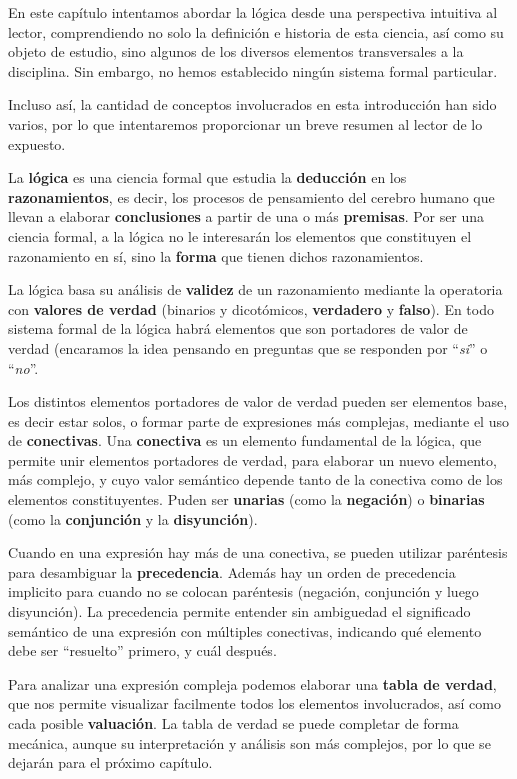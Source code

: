 En este capítulo intentamos abordar la lógica desde una perspectiva intuitiva al
lector, comprendiendo no solo la definición e historia de esta ciencia, así como
su objeto de estudio, sino algunos de los diversos elementos transversales a la
disciplina. Sin embargo, no hemos establecido ningún sistema formal particular.

Incluso así, la cantidad de conceptos involucrados en esta introducción han sido
varios, por lo que intentaremos proporcionar un breve resumen al lector de lo
expuesto.

La \textbf{lógica} es una ciencia formal que estudia la \textbf{deducción} en
los \textbf{razonamientos}, es decir, los procesos de pensamiento del cerebro
humano que llevan a elaborar \textbf{conclusiones} a partir de una o más
\textbf{premisas}. Por ser una ciencia formal, a la lógica no le interesarán los
elementos que constituyen el razonamiento en sí, sino la \textbf{forma} que
tienen dichos razonamientos.

La lógica basa su análisis de \textbf{validez} de un razonamiento mediante la
operatoria con \textbf{valores de verdad} (binarios y dicotómicos,
\textbf{verdadero} y \textbf{falso}). En todo sistema formal de la lógica habrá
elementos que son portadores de valor de verdad (encaramos la idea pensando en
preguntas que se responden por ``\textit{si}'' o ``\textit{no}''.

Los distintos elementos portadores de valor de verdad pueden ser elementos base,
es decir estar solos, o formar parte de expresiones más complejas, mediante el
uso de \textbf{conectivas}. Una \textbf{conectiva} es un elemento fundamental de
la lógica, que permite unir elementos portadores de verdad, para elaborar un
nuevo elemento, más complejo, y cuyo valor semántico depende tanto de la
conectiva como de los elementos constituyentes. Puden ser \textbf{unarias} (como
la \textbf{negación}) o \textbf{binarias} (como la \textbf{conjunción} y la
\textbf{disyunción}).

Cuando en una expresión hay más de una conectiva, se pueden utilizar paréntesis
para desambiguar la \textbf{precedencia}. Además hay un orden de precedencia
implicito para cuando no se colocan paréntesis (negación, conjunción y luego
disyunción). La precedencia permite entender sin ambiguedad el significado
semántico de una expresión con múltiples conectivas, indicando qué elemento debe
ser ``resuelto'' primero, y cuál después.

Para analizar una expresión compleja podemos elaborar una \textbf{tabla de
verdad}, que nos permite visualizar facilmente todos los elementos involucrados,
así como cada posible \textbf{valuación}. La tabla de verdad se puede completar
de forma mecánica, aunque su interpretación y análisis son más complejos, por lo
que se dejarán para el próximo capítulo.

